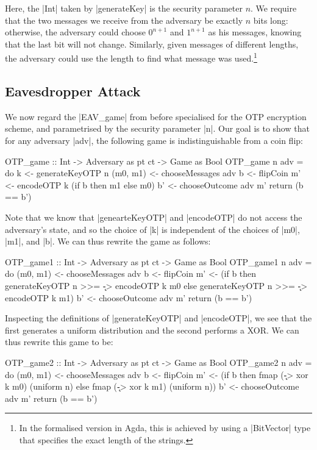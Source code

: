 Here, the |Int| taken by |generateKey| is the security parameter $n$.  We require that the two messages we receive from
the adversary be exactly $n$ bits long: otherwise, the adversary could choose $0^{n+1}$ and $1^{n+1}$ as his messages,
knowing that the last bit will not change.  Similarly, given messages of different lengths, the adversary could use the
length to find what message was used.\footnote{In the formalised version in Agda, this is achieved by using a
|BitVector| type that specifies the exact length of the strings.}

\subsection{Eavesdropper Attack}

We now regard the |EAV_game| from before specialised for the OTP encryption scheme, and parametrised by the security
parameter |n|.  Our goal is to show that for any adversary |adv|, the following game is indistinguishable from a coin
flip:
\begin{code}
OTP_game :: Int -> Adversary as pt ct -> Game as Bool
OTP_game n adv = do
    k <- generateKeyOTP n
    (m0, m1) <- chooseMessages adv
    b <- flipCoin
    m' <- encodeOTP k (if b then m1 else m0)
    b' <- chooseOutcome adv m'
    return (b == b')
\end{code}

Note that we know that |genearteKeyOTP| and |encodeOTP| do not access the adversary's state, and so the choice of |k| is
independent of the choices of |m0|, |m1|, and |b|.  We can thus rewrite the game as follows:
\begin{code}
OTP_game1 :: Int -> Adversary as pt ct -> Game as Bool
OTP_game1 n adv = do
    (m0, m1) <- chooseMessages adv
    b <- flipCoin
    m' <- (if b then generateKeyOTP n >>= \k -> encodeOTP k m0
                else generateKeyOTP n >>= \k -> encodeOTP k m1)
    b' <- chooseOutcome adv m'
    return (b == b')
\end{code}

Inspecting the definitions of |generateKeyOTP| and |encodeOTP|, we see that the first generates a uniform distribution
and the second performs a XOR.  We can thus rewrite this game to be:
\begin{code}
OTP_game2 :: Int -> Adversary as pt ct -> Game as Bool
OTP_game2 n adv = do
    (m0, m1) <- chooseMessages adv
    b <- flipCoin
    m' <- (if b then fmap (\k -> xor k m0) (uniform n)
                else fmap (\k -> xor k m1) (uniform n))
    b' <- chooseOutcome adv m'
    return (b == b')
\end{code}

